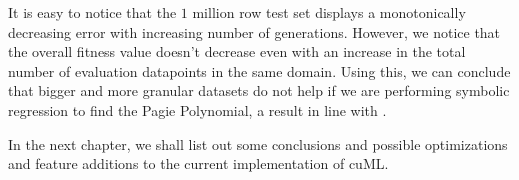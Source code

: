 It is easy to notice that the $1$ million row test set displays a monotonically decreasing error with increasing number of generations. However, we notice that the overall fitness value doesn't decrease even with an increase in the total number of evaluation datapoints in the same domain. Using this, we can conclude that bigger and more granular datasets do not help if we are performing symbolic regression to find the Pagie Polynomial, a result in line with \citep{baeta2021speed}.

In the next chapter, we shall list out some conclusions and possible optimizations and feature additions to the current implementation of cuML. 
